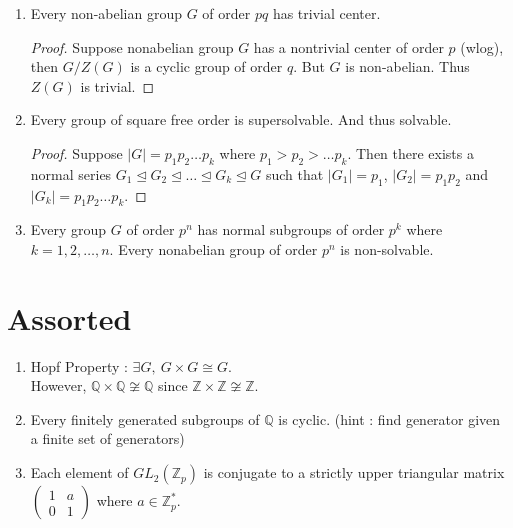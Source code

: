 \begin{enumerate}
	\item Every non-abelian group $G$ of order $pq$ has trivial center.
	\begin{proof}
		Suppose nonabelian group $G$ has a nontrivial center of order $p$ (wlog), then $G/Z(G)$ is a cyclic group of order $q$.
		But $G$ is non-abelian. Thus $Z(G)$ is trivial.
	\end{proof}
	\item Every group of square free order is supersolvable. And thus solvable.
	\begin{proof}
		Suppose $|G| = p_1 p_2 \dots p_k$ where $p_1 > p_2 > \dots p_k$. Then there exists a normal series $G_1 \trianglelefteq G_2 \trianglelefteq \dots \trianglelefteq G_k \trianglelefteq G$ such that $|G_1| = p_1$, $|G_2| = p_1p_2$ and $|G_k|=p_1p_2\dots p_k$.
	\end{proof}
	\item Every group $G$ of order $p^n$ has normal subgroups of order $p^k$ where $k = 1,2,\dots,n$. Every nonabelian group of order $p^n$ is non-solvable.
\end{enumerate}

\section{Assorted}
\begin{enumerate}
	\item Hopf Property : $\exists G,\ G \times G \cong G$.\\
	However, $\mathbb{Q} \times \mathbb{Q} \not\cong \mathbb{Q}$ since $\mathbb{Z} \times \mathbb{Z} \not\cong \mathbb{Z}$.
	\item Every finitely generated subgroups of $\mathbb{Q}$ is cyclic. (hint : find generator given a finite set of generators)
	\item Each element of $GL_2(\mathbb{Z}_p)$ is conjugate to a strictly upper triangular matrix $\begin{pmatrix} 1 & a \\ 0 & 1 \end{pmatrix}$ where $a \in \mathbb{Z}_p^\ast$.
\end{enumerate}
